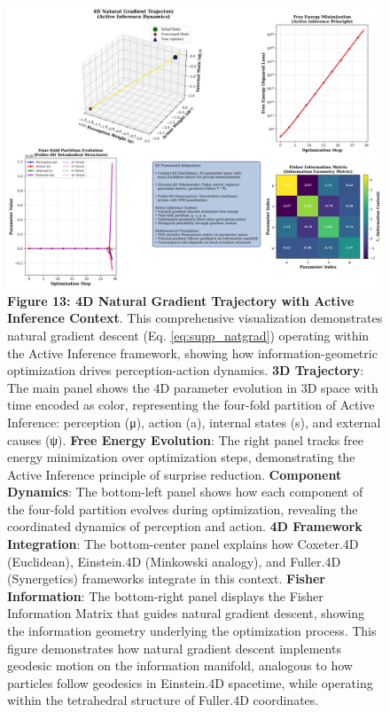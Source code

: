 \documentclass[
  10pt,
]{article}
\begin{document}
\begin{figure}
\centering
\includegraphics{../output/figures/figure_13_4d_trajectory.png}
\caption{\textbf{Figure 13: 4D Natural Gradient Trajectory with Active
Inference Context}. This comprehensive visualization demonstrates
natural gradient descent (Eq. \eqref{eq:supp_natgrad}) operating within
the Active Inference framework, showing how information-geometric
optimization drives perception-action dynamics. \textbf{3D Trajectory}:
The main panel shows the 4D parameter evolution in 3D space with time
encoded as color, representing the four-fold partition of Active
Inference: perception (μ), action (a), internal states (s), and external
causes (ψ). \textbf{Free Energy Evolution}: The right panel tracks free
energy minimization over optimization steps, demonstrating the Active
Inference principle of surprise reduction. \textbf{Component Dynamics}:
The bottom-left panel shows how each component of the four-fold
partition evolves during optimization, revealing the coordinated
dynamics of perception and action. \textbf{4D Framework Integration}:
The bottom-center panel explains how Coxeter.4D (Euclidean), Einstein.4D
(Minkowski analogy), and Fuller.4D (Synergetics) frameworks integrate in
this context. \textbf{Fisher Information}: The bottom-right panel
displays the Fisher Information Matrix that guides natural gradient
descent, showing the information geometry underlying the optimization
process. This figure demonstrates how natural gradient descent
implements geodesic motion on the information manifold, analogous to how
particles follow geodesics in Einstein.4D spacetime, while operating
within the tetrahedral structure of Fuller.4D coordinates.}
\end{figure}
\end{document}
